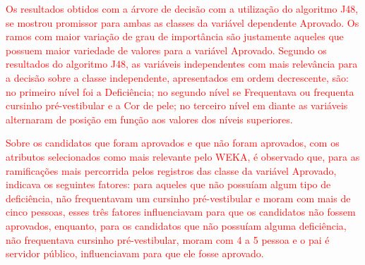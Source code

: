 \label{chapter:Conclusão}

\par
\textcolor{red}{Os resultados obtidos com a árvore de decisão com a utilização do algoritmo J48, se mostrou promissor para ambas as classes da variável dependente Aprovado. Os ramos com maior variação de grau de importância são justamente aqueles que possuem maior variedade de valores para a variável Aprovado. Segundo os resultados do algoritmo J48, as variáveis independentes com mais relevância para a decisão sobre a classe independente, apresentados em ordem decrescente, são: no primeiro nível foi a Deficiência; no segundo nível se Frequentava ou frequenta cursinho pré-vestibular e a Cor de pele; no terceiro nível em diante as variáveis alternaram de posição em função aos valores dos níveis superiores.}

\par
\textcolor{red}{Sobre os candidatos que foram aprovados e que não foram aprovados, com os atributos selecionados como mais relevante pelo WEKA, é observado que, para as ramificações mais percorrida pelos registros das classe da variável Aprovado, indicava os seguintes fatores: para aqueles que não possuíam algum tipo de deficiência, não frequentavam um cursinho pré-vestibular e moram com mais de cinco pessoas, esses três fatores influenciavam para que os candidatos não fossem aprovados, enquanto, para os candidatos que não possuíam alguma deficiência, não frequentava cursinho pré-vestibular, moram com 4 a 5 pessoa e o pai é servidor público, influenciavam para que ele fosse aprovado.}

\par
\textcolor{red}{}